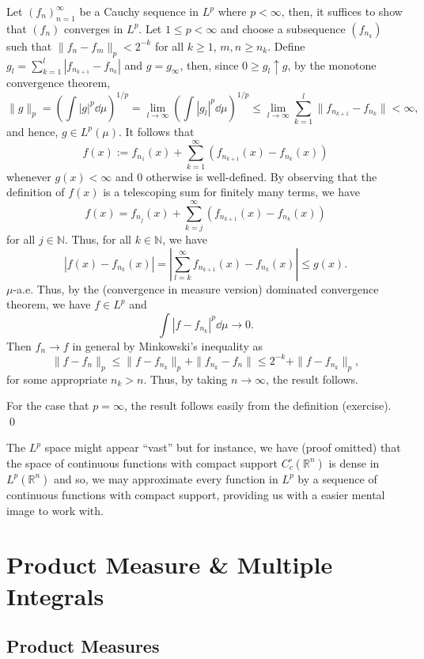 \documentclass[
]{article}
\theoremstyle{definition}
\theoremstyle{definition}
\begin{document}
Let \((f_n)_{n = 1}^\infty\) be a Cauchy sequence in \(L^p\) where
\(p < \infty\), then, it suffices to show that \((f_n)\) converges in
\(L^p\). Let \(1 \le p < \infty\) and choose a subsequence \((f_{n_k})\)
such that \(\|f_n - f_m\|_p < 2^{-k}\) for all \(k \ge 1\),
\(m, n \ge n_k\). Define
\(g_l = \sum_{k = 1}^l |f_{n_{k + 1}} - f_{n_k}|\) and \(g = g_\infty\),
then, since \(0 \ge g_l \uparrow g\), by the monotone convergence
theorem,
\[\|g\|_p = \left(\int |g|^p \dd\mu\right)^{1 / p} = \lim_{l \to \infty}
   \left(\int |g_l|^p \dd\mu\right)^{1 / p} \le 
   \lim_{l \to \infty} \sum_{k = 1}^l \|f_{n_{k + 1}} - f_{n_k}\| < \infty,\]
and hence, \(g \in L^p(\mu)\). It follows that
\[f(x) := f_{n_1}(x) + \sum_{k = 1}^\infty(f_{n_{k + 1}}(x) - f_{n_k}(x))\]
whenever \(g(x) < \infty\) and 0 otherwise is well-defined. By observing
that the definition of \(f(x)\) is a telescoping sum for finitely many
terms, we have
\[f(x) = f_{n_j}(x) + \sum_{k = j}^\infty(f_{n_{k + 1}}(x) - f_{n_k}(x))\]
for all \(j \in \mathbb{N}\). Thus, for all \(k \in \mathbb{N}\), we
have
\[|f(x) - f_{n_k}(x)| = \left| \sum_{l = k}^\infty f_{n_{k + 1}}(x) - f_{n_k}(x)\right| 
    \le g(x).\] \(\mu\)-a.e. Thus, by the (convergence in measure
version) dominated convergence theorem, we have \(f \in L^p\) and
\[\int|f - f_{n_k}|^p \dd \mu \to 0.\] Then \(f_n \to f\) in general by
Minkowski's inequality as
\[\|f - f_n\|_p \le \|f - f_{n_k}\|_p + \|f_{n_k} - f_n\| \le 2^{-k} + \|f - f_{n_k}\|_p,\]
for some appropriate \(n_k > n\). Thus, by taking \(n \to \infty\), the
result follows.

For the case that \(p = \infty\), the result follows easily from the
definition (exercise). \qed

The \(L^p\) space might appear ``vast'' but for instance, we have (proof
omitted) that the space of continuous functions with compact support
\(C^\circ_c(\mathbb{R}^n)\) is dense in \(L^p(\mathbb{R}^n)\) and so, we
may approximate every function in \(L^p\) by a sequence of continuous
functions with compact support, providing us with a easier mental image
to work with.

\newpage

\hypertarget{product-measure-multiple-integrals}{%
\section{Product Measure \& Multiple
Integrals}\label{product-measure-multiple-integrals}}

\hypertarget{product-measures}{%
\subsection{Product Measures}\label{product-measures}}
\end{document}
